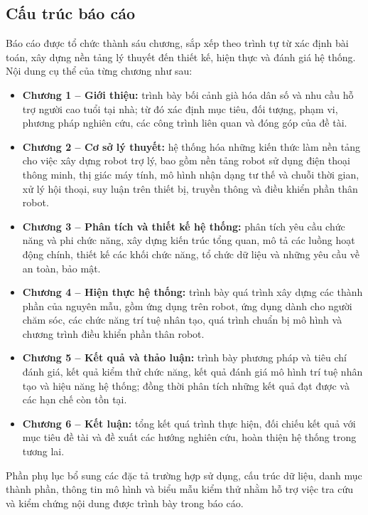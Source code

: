 \subsection{Cấu trúc báo cáo}

Báo cáo được tổ chức thành sáu chương, sắp xếp theo trình tự từ xác định bài toán, xây dựng nền tảng lý thuyết đến thiết kế, hiện thực và đánh giá hệ thống. Nội dung cụ thể của từng chương như sau:

\begin{itemize}
    \item \textbf{Chương 1 -- Giới thiệu:} trình bày bối cảnh già hóa dân số và nhu cầu hỗ trợ người cao tuổi tại nhà; từ đó xác định mục tiêu, đối tượng, phạm vi, phương pháp nghiên cứu, các công trình liên quan và đóng góp của đề tài.
    \item \textbf{Chương 2 -- Cơ sở lý thuyết:} hệ thống hóa những kiến thức làm nền tảng cho việc xây dựng robot trợ lý, bao gồm nền tảng robot sử dụng điện thoại thông minh, thị giác máy tính, mô hình nhận dạng tư thế và chuỗi thời gian, xử lý hội thoại, suy luận trên thiết bị, truyền thông và điều khiển phần thân robot.
    \item \textbf{Chương 3 -- Phân tích và thiết kế hệ thống:} phân tích yêu cầu chức năng và phi chức năng, xây dựng kiến trúc tổng quan, mô tả các luồng hoạt động chính, thiết kế các khối chức năng, tổ chức dữ liệu và những yêu cầu về an toàn, bảo mật.
    \item \textbf{Chương 4 -- Hiện thực hệ thống:} trình bày quá trình xây dựng các thành phần của nguyên mẫu, gồm ứng dụng trên robot, ứng dụng dành cho người chăm sóc, các chức năng trí tuệ nhân tạo, quá trình chuẩn bị mô hình và chương trình điều khiển phần thân robot.
    \item \textbf{Chương 5 -- Kết quả và thảo luận:} trình bày phương pháp và tiêu chí đánh giá, kết quả kiểm thử chức năng, kết quả đánh giá mô hình trí tuệ nhân tạo và hiệu năng hệ thống; đồng thời phân tích những kết quả đạt được và các hạn chế còn tồn tại.
    \item \textbf{Chương 6 -- Kết luận:} tổng kết quá trình thực hiện, đối chiếu kết quả với mục tiêu đề tài và đề xuất các hướng nghiên cứu, hoàn thiện hệ thống trong tương lai.
\end{itemize}

Phần phụ lục bổ sung các đặc tả trường hợp sử dụng, cấu trúc dữ liệu, danh mục thành phần, thông tin mô hình và biểu mẫu kiểm thử nhằm hỗ trợ việc tra cứu và kiểm chứng nội dung được trình bày trong báo cáo.

